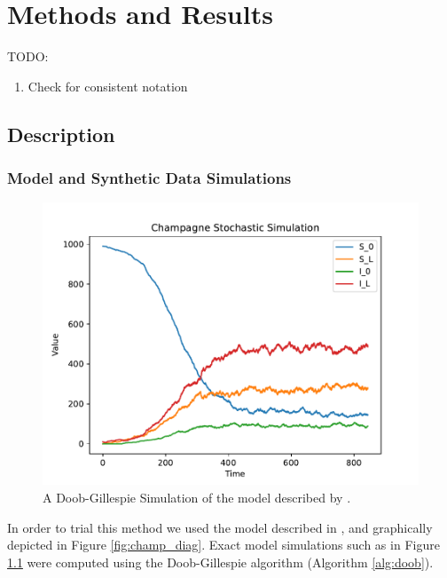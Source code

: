 \chapter{Methods and Results}

TODO:\begin{enumerate}
    \item Check for consistent notation
\end{enumerate}

\section{Description}

\subsection*{Model and Synthetic Data Simulations}

\begin{figure}[htbp]
    \centering
    \includegraphics{../champagne_GP_images/champagne_simulation.pdf}
    \caption{A Doob-Gillespie Simulation of the model described by \cite{champagne_using_2022}.}\label{fig:champ_doob}
\end{figure}

In order to trial this method we used the model described in
\cite{champagne_using_2022}, and graphically depicted in Figure
\ref{fig:champ_diag}. Exact model simulations such as in Figure
\ref{fig:champ_doob} were computed using the
Doob-Gillespie algorithm (Algorithm \ref{alg:doob}).

